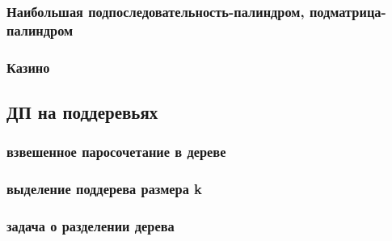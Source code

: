 \documentclass[a4paper,12pt]{article}
\begin{document}
      \subsubsection{Наибольшая подпоследовательность-палиндром, подматрица-палиндром}
      \subsubsection{Казино}

    \subsection{ДП на поддеревьях}

      \subsubsection{взвешенное паросочетание в дереве}

      \subsubsection{выделение поддерева размера k}

      \subsubsection{задача о разделении дерева}
\end{document}
